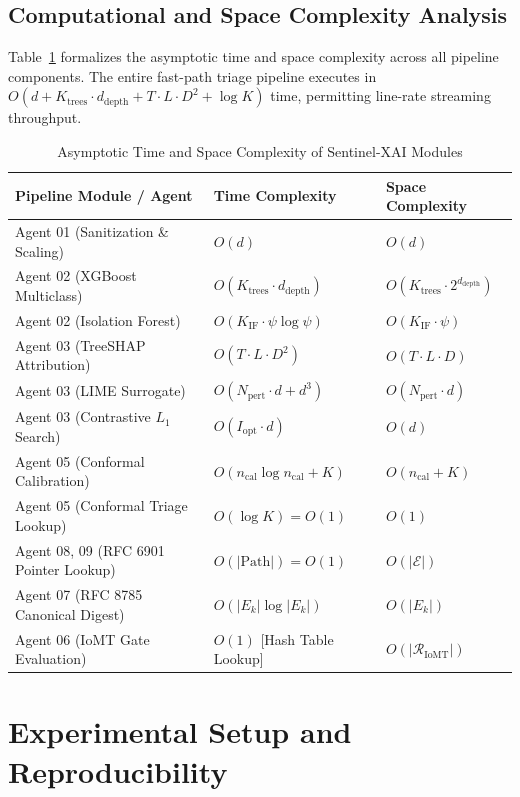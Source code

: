 \documentclass{ieeeaccess}
\begin{document}
\subsection{Computational and Space Complexity Analysis}
Table~\ref{tab:complexity} formalizes the asymptotic time and space complexity across all pipeline components. The entire fast-path triage pipeline executes in $O(d + K_{\text{trees}} \cdot d_{\text{depth}} + T \cdot L \cdot D^2 + \log K)$ time, permitting line-rate streaming throughput.

\begin{table}[t]
\centering
\caption{Asymptotic Time and Space Complexity of Sentinel-XAI Modules}
\label{tab:complexity}
\begin{tabular}{lll}
\toprule
\textbf{Pipeline Module / Agent} & \textbf{Time Complexity} & \textbf{Space Complexity} \\
\midrule
Agent 01 (Sanitization \& Scaling) & $O(d)$ & $O(d)$ \\
Agent 02 (XGBoost Multiclass) & $O(K_{\text{trees}} \cdot d_{\text{depth}})$ & $O(K_{\text{trees}} \cdot 2^{d_{\text{depth}}})$ \\
Agent 02 (Isolation Forest) & $O(K_{\text{IF}} \cdot \psi \log \psi)$ & $O(K_{\text{IF}} \cdot \psi)$ \\
Agent 03 (TreeSHAP Attribution) & $O(T \cdot L \cdot D^2)$ & $O(T \cdot L \cdot D)$ \\
Agent 03 (LIME Surrogate) & $O(N_{\text{pert}} \cdot d + d^3)$ & $O(N_{\text{pert}} \cdot d)$ \\
Agent 03 (Contrastive $L_1$ Search) & $O(I_{\text{opt}} \cdot d)$ & $O(d)$ \\
Agent 05 (Conformal Calibration) & $O(n_{\text{cal}} \log n_{\text{cal}} + K)$ & $O(n_{\text{cal}} + K)$ \\
Agent 05 (Conformal Triage Lookup) & $O(\log K) = O(1)$ & $O(1)$ \\
Agent 08, 09 (RFC 6901 Pointer Lookup) & $O(|\text{Path}|) = O(1)$ & $O(|\mathcal{E}|)$ \\
Agent 07 (RFC 8785 Canonical Digest) & $O(|E_k| \log |E_k|)$ & $O(|E_k|)$ \\
Agent 06 (IoMT Gate Evaluation) & $O(1)$ [Hash Table Lookup] & $O(|\mathcal{R}_{\text{IoMT}}|)$ \\
\bottomrule
\end{tabular}
\end{table}

\section{Experimental Setup and Reproducibility}
\label{sec:experiments}
\end{document}
